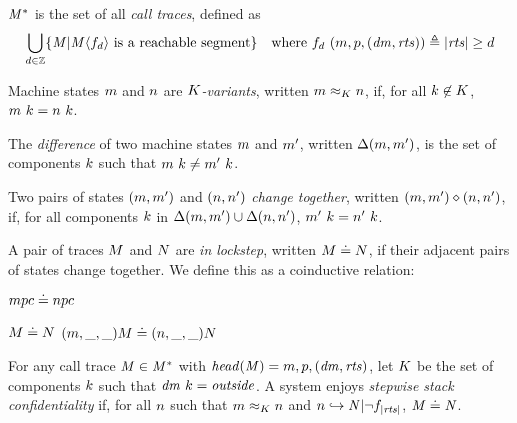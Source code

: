 \documentclass[acmsmall,review,anonymous]{acmart}\settopmatter{printfolios=true,printccs=false,printacmref=false}
\begin{document}
 \(\mathit{M}^*\) is the set of all \emph{call traces}, defined as
\[\begin{aligned}
\bigcup_{d \in \mathbb{Z}} \{\mathit{M} | \mathit{M}\langle f_d \rangle
\text{ is a reachable segment}\} \hspace{1em} &
\text{where } f_d ~ (m,p,(\mathit{dm},\mathit{rts})) \triangleq |\mathit{rts}| \geq d \\
\end{aligned}\]

 Machine states \(m\) and \(n\) are {\em \(K\)-variants},
written \(m \approx_K n\), if, for
all \(k \not \in K\), \(m ~ k = n ~ k\).

 The \emph{difference} of two machine states \(m\) and \(m'\), written \(\Delta(m,m')\),
is the set of components \(k\)
such that \(m ~ k \not = m' ~ k\).

 Two pairs of states \((m,m')\) and \((n,n')\)
 {\em change together}, written \((m,m') \diamond (n,n')\), if, for all components \(k\) in
\(\Delta(m,m') \cup \Delta(n,n')\),
\(m' ~ k = n' ~ k\). 

 A pair of traces \(M\) and \(N\) are {\em in lockstep},
written \(M \doteq N\), 
if their adjacent pairs of states change together.  We define this as a coinductive relation:

\begin{minipage}{.3\textwidth}
\judgment{}
         {\(mpc \doteq npc\)}
\end{minipage}
\begin{minipage}{.6\textwidth}
\judgmenttwo{\(\mach, \pi_\mach(\head(\machT)) \diamond \nach, \pi_\mach(\head(\nachT))\)}
            {\(M \doteq N\)}
            {\((m,\_,\_) M \doteq (n,\_,\_) N\)}
\end{minipage}


For any call trace \(\mathit{M} \in \mathit{M}^*\) with \(\mathit{head}(\mathit{M}) = m,p,(\mathit{dm},\mathit{rts})\),
let \(K\) be the set of components \(k\) such that
\(\mathit{dm} ~ k = \mathit{outside}\).
A system enjoys \emph{stepwise stack confidentiality} if,
for all \(n\) such that \(m \approx_K n\) and
\(n \hookrightarrow \mathit{N} | \neg f_{|\mathit{rts}|}\),
\(\mathit{M} \doteq \mathit{N}\).
\end{document}
